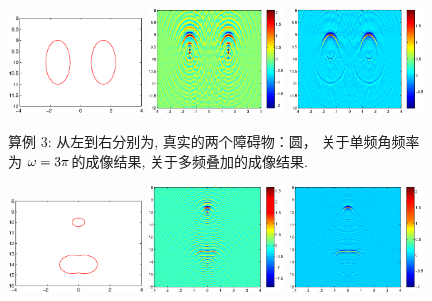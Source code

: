 {\begin{figure}[htbp]
	\centering
	\includegraphics[width=0.32\textwidth,height=0.16\textheight]{./Img/graphic/bi_circle_profile.eps}
	\includegraphics[width=0.32\textwidth]{./Img/graphic/bi_circle_3pi.eps}
	\includegraphics[width=0.32\textwidth]{./Img/graphic/bi_circle.eps}
	
	\caption{算例 3: 从左到右分别为,  真实的两个障碍物：圆， 关于单频角频率为 $\omega=3\pi$的成像结果, 关于多频叠加的成像结果.}\label{figure_31}
\end{figure}

\begin{figure}[htbp]
	\centering
	\includegraphics[width=0.32\textwidth,height=0.16\textheight]{./Img/graphic/circle_0_4_peanut_1_profile.eps}
	\includegraphics[width=0.32\textwidth]{./Img/graphic/circle_0_4_peanut_1_3pi_1.eps}
	\includegraphics[width=0.32\textwidth]{./Img/graphic/circle_0_4_peanut_1_multi_1.eps}
	

\end{figure}}
